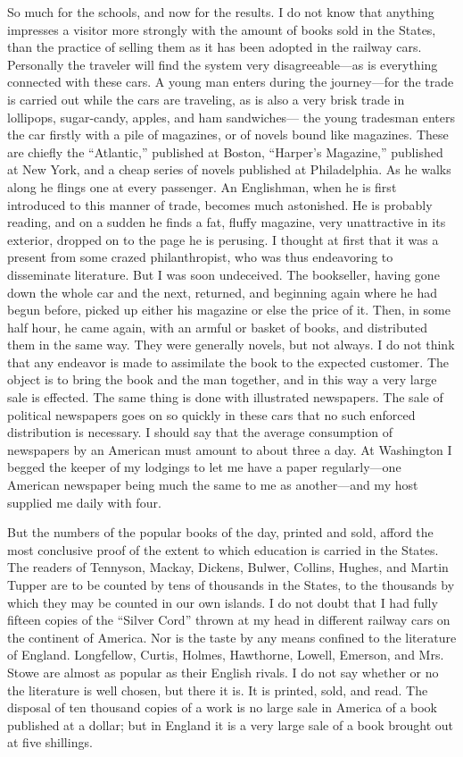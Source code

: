 So much for the schools, and now for the results.  I do not know
that anything impresses a visitor more strongly with the amount of
books sold in the States, than the practice of selling them as it
has been adopted in the railway cars.  Personally the traveler will
find the system very disagreeable---as is everything connected with
these cars.  A young man enters during the journey---for the trade
is carried out while the cars are traveling, as is also a very
brisk trade in lollipops, sugar-candy, apples, and ham sandwiches---%
the young tradesman enters the car firstly with a pile of
magazines, or of novels bound like magazines.  These are chiefly
the ``Atlantic,'' published at Boston, ``Harper's Magazine,'' published
at New York, and a cheap series of novels published at
Philadelphia.  As he walks along he flings one at every passenger.
An Englishman, when he is first introduced to this manner of trade,
becomes much astonished.  He is probably reading, and on a sudden
he finds a fat, fluffy magazine, very unattractive in its exterior,
dropped on to the page he is perusing.  I thought at first that it
was a present from some crazed philanthropist, who was thus
endeavoring to disseminate literature.  But I was soon undeceived.
The bookseller, having gone down the whole car and the next,
returned, and beginning again where he had begun before, picked up
either his magazine or else the price of it.  Then, in some half
hour, he came again, with an armful or basket of books, and
distributed them in the same way.  They were generally novels, but
not always.  I do not think that any endeavor is made to assimilate
the book to the expected customer.  The object is to bring the book
and the man together, and in this way a very large sale is
effected.  The same thing is done with illustrated newspapers.  The
sale of political newspapers goes on so quickly in these cars that
no such enforced distribution is necessary.  I should say that the
average consumption of newspapers by an American must amount to
about three a day.  At Washington I begged the keeper of my
lodgings to let me have a paper regularly---one American newspaper
being much the same to me as another---and my host supplied me daily
with four.

But the numbers of the popular books of the day, printed and sold,
afford the most conclusive proof of the extent to which education
is carried in the States.  The readers of Tennyson, Mackay,
Dickens, Bulwer, Collins, Hughes, and Martin Tupper are to be
counted by tens of thousands in the States, to the thousands by
which they may be counted in our own islands.  I do not doubt that
I had fully fifteen copies of the ``Silver Cord'' thrown at my head
in different railway cars on the continent of America.  Nor is the
taste by any means confined to the literature of England.
Longfellow, Curtis, Holmes, Hawthorne, Lowell, Emerson, and Mrs.\ %
Stowe are almost as popular as their English rivals.  I do not say
whether or no the literature is well chosen, but there it is.  It
is printed, sold, and read.  The disposal of ten thousand copies of
a work is no large sale in America of a book published at a dollar;
but in England it is a very large sale of a book brought out at
five shillings.

